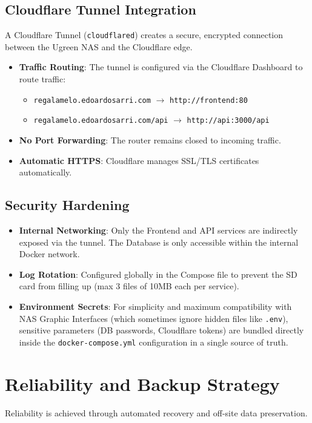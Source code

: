 \subsection{Cloudflare Tunnel Integration}
A Cloudflare Tunnel (\texttt{cloudflared}) creates a secure, encrypted connection between the Ugreen NAS and the Cloudflare edge.
\begin{itemize}
    \item \textbf{Traffic Routing}: The tunnel is configured via the Cloudflare Dashboard to route traffic:
    \begin{itemize}
        \item \texttt{regalamelo.edoardosarri.com} $\rightarrow$ \texttt{http://frontend:80}
        \item \texttt{regalamelo.edoardosarri.com/api} $\rightarrow$ \texttt{http://api:3000/api}
    \end{itemize}
    \item \textbf{No Port Forwarding}: The router remains closed to incoming traffic.
    \item \textbf{Automatic HTTPS}: Cloudflare manages SSL/TLS certificates automatically.
\end{itemize}

\subsection{Security Hardening}
\begin{itemize}
    \item \textbf{Internal Networking}: Only the Frontend and API services are indirectly exposed via the tunnel. The Database is only accessible within the internal Docker network.
    \item \textbf{Log Rotation}: Configured globally in the Compose file to prevent the SD card from filling up (max 3 files of 10MB each per service).
    \item \textbf{Environment Secrets}: For simplicity and maximum compatibility with NAS Graphic Interfaces (which sometimes ignore hidden files like \texttt{.env}), sensitive parameters (DB passwords, Cloudflare tokens) are bundled directly inside the \texttt{docker-compose.yml} configuration in a single source of truth.
\end{itemize}

\section{Reliability and Backup Strategy}
Reliability is achieved through automated recovery and off-site data preservation.

